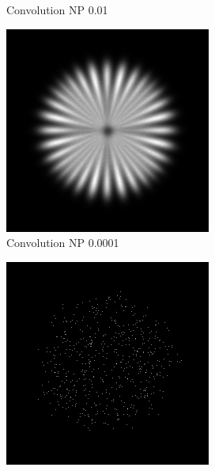 \documentclass{./packages/optica-article}
\begin{document}
\begin{figure}[hbp]
\begin{center}
\begin{subfigure}[t]{0.25\textwidth}
			\caption{Convolution NP 0.01}\label{fig:sim:np0.01}
		\end{subfigure}
		\hfill
		\begin{subfigure}[t]{0.25\textwidth}\centering
			\centering
			\includegraphics[width=\textwidth]{Simulation deconvolution/ref_np_0.0001}
			\caption{Convolution NP 0.0001}
		\end{subfigure}
		\hfill
		\begin{subfigure}[t]{0.25\textwidth}\centering
			\centering
			\includegraphics[width=\textwidth]{Simulation deconvolution/ref_np_10}

\end{subfigure}
\end{center}
\end{figure}
\end{document}
